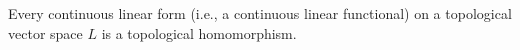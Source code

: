 Every continuous linear form (i.e., a continuous linear functional) on a topological vector space $L$ is a topological homomorphism.
